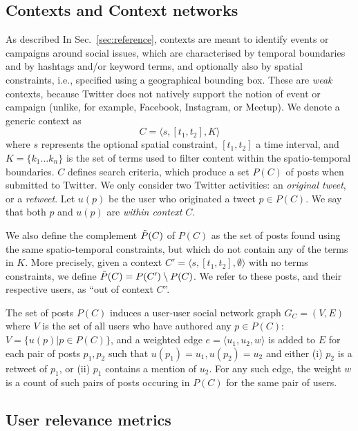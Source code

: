 \documentclass[runningheads]{llncs}
\begin{document}
\subsection{Contexts and Context networks} \label{sec:contexts}

As described In Sec.~\ref{sec:reference}, contexts are meant to identify events or campaigns around social issues, which are characterised by temporal boundaries and by hashtags and/or keyword terms, and optionally also by spatial constraints, i.e., specified using a geographical bounding box.
These are \textit{weak} contexts, because Twitter does not natively support the notion of event or campaign (unlike, for example, Facebook, Instagram, or Meetup).
We denote a generic context as
\begin{equation}
C = \langle s, [t_1, t_2], K \rangle 
\label{eq:context}
\end{equation}
where $s$ represents the optional spatial constraint, $[t_1, t_2]$ a time interval, and $K = \{ k_1 \dots k_n\}$ is the set of terms used to filter content within the spatio-temporal boundaries.
%
$C$ defines search criteria, which produce a set $P(C)$ of posts when submitted to Twitter.
We only consider two Twitter activities: an \textit{original tweet}, or a \textit{retweet}.
Let $u(p)$ be the user who originated a tweet $p \in P(C)$.
We say that both $p$ and $u(p)$ are \textit{within context} $C$.

We also define the complement $\Tilde{P}(C)$ of $P(C)$ as the set of posts found using the same spatio-temporal constraints, but which do not contain any of the terms in $K$. More precisely, given a context $C'= \langle s, [t_1, t_2], \emptyset \rangle$ with no terms constraints, we define $\Tilde{P}(C) = P(C') \setminus P(C)$. 
We refer to these posts, and their respective users, as ``out of context $C$''.

The set of posts $P(C)$ induces a user-user social network graph $G_C = (V,E)$ where $V$ is the set of all users who have authored any $p \in P(C)$: 
$V = \{ u(p) | p \in P(C) \}$, and a weighted edge $e = \langle u_1, u_2, w \rangle$ is added to $E$ for each pair of posts $p_1, p_2$ such that $u(p_1) = u_1, u(p_2) = u_2$ and 
either (i) $p_2$ is a retweet of $p_1$, or (ii) $p_1$ contains a mention of $u_2$.
For any such edge, the weight $w$ is a count of such pairs of posts occuring in $P(C)$ for the same pair of users.

\subsection{User relevance metrics}  \label{sec:metrics}
\end{document}
